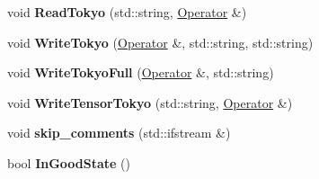 \begin{DoxyCompactItemize}
\item 
\hypertarget{classReadWrite_a2404230a7fbde1ba2c55ca58d5d396ec}{void {\bfseries Read\-Tokyo} (std\-::string, \hyperlink{classOperator}{Operator} \&)}\label{classReadWrite_a2404230a7fbde1ba2c55ca58d5d396ec}

\item 
\hypertarget{classReadWrite_a05a81352b12e1daf42848671cbe94fc1}{void {\bfseries Write\-Tokyo} (\hyperlink{classOperator}{Operator} \&, std\-::string, std\-::string)}\label{classReadWrite_a05a81352b12e1daf42848671cbe94fc1}

\item 
\hypertarget{classReadWrite_a614bc24d9f5fb85c5975afbed467b9e8}{void {\bfseries Write\-Tokyo\-Full} (\hyperlink{classOperator}{Operator} \&, std\-::string)}\label{classReadWrite_a614bc24d9f5fb85c5975afbed467b9e8}

\item 
\hypertarget{classReadWrite_a9c601b34e173133975de789e0a3f920d}{void {\bfseries Write\-Tensor\-Tokyo} (std\-::string, \hyperlink{classOperator}{Operator} \&)}\label{classReadWrite_a9c601b34e173133975de789e0a3f920d}

\item 
\hypertarget{classReadWrite_aaeadcb3323d37d5c73aa3f5147a5bfc2}{void {\bfseries skip\-\_\-comments} (std\-::ifstream \&)}\label{classReadWrite_aaeadcb3323d37d5c73aa3f5147a5bfc2}

\item 
\hypertarget{classReadWrite_a05ec8e21842e94d788bb36c7d11f46b9}{bool {\bfseries In\-Good\-State} ()}\label{classReadWrite_a05ec8e21842e94d788bb36c7d11f46b9}

\end{DoxyCompactItemize}
